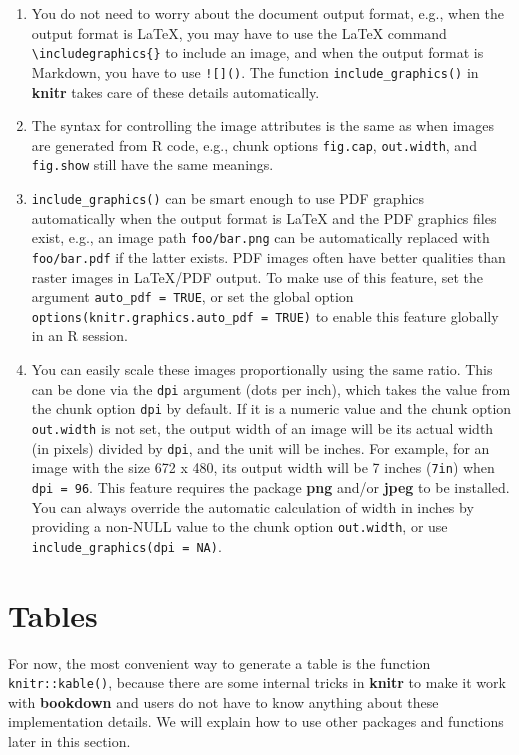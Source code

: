\documentclass[
  12pt,
]{krantz}
\providecommand{\tightlist}{%
  \setlength{\itemsep}{0pt}\setlength{\parskip}{0pt}}
\theoremstyle{definition}
\theoremstyle{definition}
\theoremstyle{definition}
\theoremstyle{definition}
\theoremstyle{remark}
\begin{document}
\begin{enumerate}
\def\labelenumi{\arabic{enumi}.}
\tightlist
\item
  You do not need to worry about the document output format, e.g., when the output format is LaTeX, you may have to use the LaTeX command \texttt{\textbackslash{}includegraphics\{\}} to include an image, and when the output format is Markdown, you have to use \texttt{!{[}{]}()}. The function \texttt{include\_graphics()} in \textbf{knitr} takes care of these details automatically.
\item
  The syntax for controlling the image attributes is the same as when images are generated from R code, e.g., chunk options \texttt{fig.cap}, \texttt{out.width}, and \texttt{fig.show} still have the same meanings.
\item
  \texttt{include\_graphics()} can be smart enough to use PDF graphics automatically when the output format is LaTeX and the PDF graphics files exist, e.g., an image path \texttt{foo/bar.png} can be automatically replaced with \texttt{foo/bar.pdf} if the latter exists. PDF images often have better qualities than raster images in LaTeX/PDF output. To make use of this feature, set the argument \texttt{auto\_pdf\ =\ TRUE}, or set the global option \texttt{options(knitr.graphics.auto\_pdf\ =\ TRUE)} to enable this feature globally in an R session.
\item
  You can easily scale these images proportionally using the same ratio. This can be done via the \texttt{dpi} argument (dots per inch), which takes the value from the chunk option \texttt{dpi} by default. If it is a numeric value and the chunk option \texttt{out.width} is not set, the output width of an image will be its actual width (in pixels) divided by \texttt{dpi}, and the unit will be inches. For example, for an image with the size 672 x 480, its output width will be 7 inches (\texttt{7in}) when \texttt{dpi\ =\ 96}. This feature requires the package \textbf{png} and/or \textbf{jpeg} to be installed. You can always override the automatic calculation of width in inches by providing a non-NULL value to the chunk option \texttt{out.width}, or use \texttt{include\_graphics(dpi\ =\ NA)}.
\end{enumerate}

\hypertarget{tables}{%
\section{Tables}\label{tables}}

For now, the most convenient way to generate a table is the function \texttt{knitr::kable()}, because there are some internal tricks in \textbf{knitr} to make it work with \textbf{bookdown} and users do not have to know anything about these implementation details. We will explain how to use other packages and functions later in this section.
\end{document}
